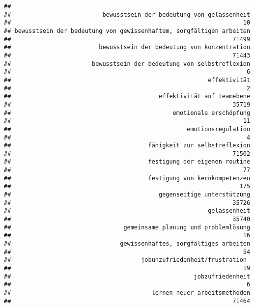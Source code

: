 \documentclass[
]{article}
\begin{document}
\begin{verbatim}
## 
##                          bewusstsein der bedeutung von gelassenheit 
##                                                                  10 
## bewusstsein der bedeutung von gewissenhaftem, sorgfältigen arbeiten 
##                                                               71499 
##                         bewusstsein der bedeutung von konzentration 
##                                                               71443 
##                       bewusstsein der bedeutung von selbstreflexion 
##                                                                   6 
##                                                        effektivität 
##                                                                   2 
##                                          effektivität auf teamebene 
##                                                               35719 
##                                              emotionale erschöpfung 
##                                                                  11 
##                                                  emotionsregulation 
##                                                                   4 
##                                       fähigkeit zur selbstreflexion 
##                                                               71502 
##                                       festigung der eigenen routine 
##                                                                  77 
##                                       festigung von kernkompetenzen 
##                                                                 175 
##                                          gegenseitige unterstützung 
##                                                               35726 
##                                                        gelassenheit 
##                                                               35740 
##                                gemeinsame planung und problemlösung 
##                                                                  16 
##                               gewissenhaftes, sorgfältiges arbeiten 
##                                                                  54 
##                                     jobunzufriedenheit/frustration  
##                                                                  19 
##                                                    jobzufriedenheit 
##                                                                   6 
##                                        lernen neuer arbeitsmethoden 
##                                                               71464 

\end{verbatim}
\end{document}
